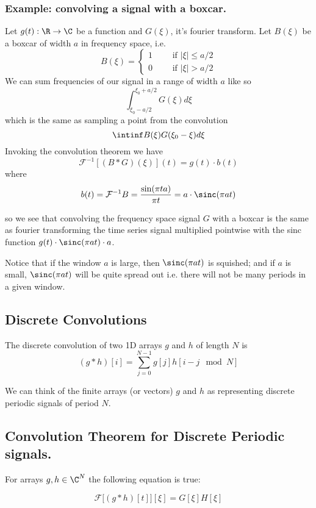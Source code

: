 \documentclass[12pt]{article}
\begin{document}
\subsubsection{Example: convolving a signal with a boxcar.}
Let $g(t) : \R\to\C$ be a function and $G(\xi)$, it's fourier transform. Let $B(\xi)$ be a boxcar of width $a$ in frequency space, i.e.
$$B(\xi) = \begin{cases} 1\qquad\text{ if }|\xi|\leq a/2\\ 0\qquad\text{ if }|\xi| > a/2 \end{cases}$$
We can sum frequencies of our signal in a range of width $a$ like so
$$\int_{\xi_0-a/2}^{\xi_0+a/2} G(\xi) d\xi$$
which is the same as sampling a point from the convolution
$$\intinf B(\xi)G(\xi_0 - \xi)d\xi$$
Invoking the convolution theorem we have
$$\mathcal F^{-1}[(B\ast G)(\xi)](t) = g(t)\cdot b(t)$$
where 
$$b(t) = \mathcal F^{-1}B = \frac{\sin(\pi t a)}{\pi t} = a \cdot \sinc(\pi a t)$$

so we see that convolving the frequency space signal $G$ with a boxcar is the same as fourier transforming the time series signal multiplied pointwise with the sinc function $g(t)\cdot \sinc(\pi a t)\cdot a$.

Notice that if the window $a$ is large, then $\sinc(\pi a t)$ is squished; and if $a$ is small, $\sinc(\pi a t)$ will be quite spread out i.e. there will not be many periods in a given window. 

\subsection{Discrete Convolutions}
The discrete convolution of two 1D arrays $g$ and $h$ of length $N$ is 
$$(g\ast h)[i] = \sum_{j=0}^{N-1}g[j] h[i-j \mod N]$$

We can think of the finite arrays (or vectors) $g$ and $h$ as representing discrete periodic signals of period $N$. 

\subsection{Convolution Theorem for Discrete Periodic signals.}\label{sec:discrete conv thm}

For arrays $g,h\in \C^N$ the following equation is true:

\begin{equation}
    \mathcal F\big[(g\ast h)[t]\big][\xi] = G[\xi]H[\xi]
\end{equation}
\end{document}

